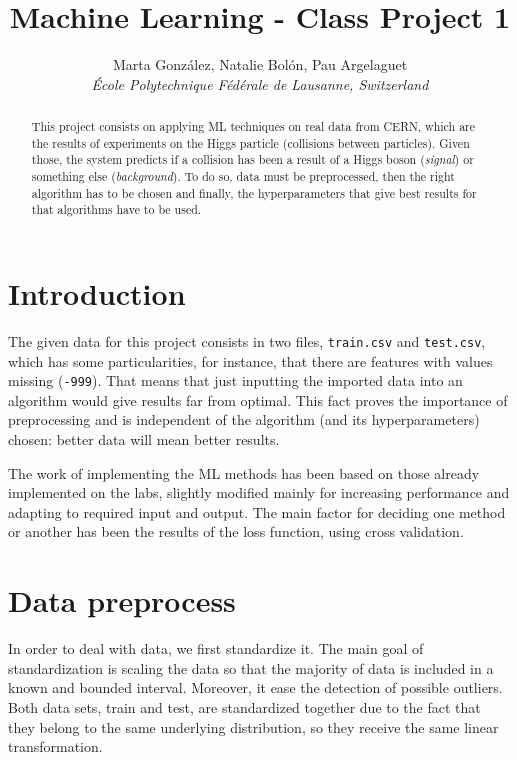 \documentclass[10pt,conference]{IEEEtran}
\begin{document}
\title{\huge Machine Learning - Class Project 1}

\author{
  Marta González, Natalie Bolón, Pau Argelaguet\\
  \small \textit{École Polytechnique Fédérale de Lausanne, Switzerland}
}

\maketitle

\begin{abstract}
This project consists on applying ML techniques on real data from CERN, which are the results of experiments on the Higgs particle (collisions between particles). Given those, the system predicts if a collision has been a result of a Higgs boson (\textit{signal}) or something else (\textit{background}). To do so, data must be preprocessed, then the right algorithm has to be chosen and finally, the hyperparameters that give best results for that algorithms have to be used.
\end{abstract}

\section{Introduction}

The given data for this project consists in two files, \verb|train.csv| and \verb|test.csv|, which has some particularities, for instance, that there are features with values missing (\verb|-999|). That means that just inputting the imported data into an algorithm would give results far from optimal. This fact proves the importance of preprocessing and is independent of the algorithm (and its hyperparameters) chosen: better data will mean better results.

The work of implementing the ML methods has been based on those already implemented on the labs, slightly modified mainly for increasing performance and adapting to required input and output. The main factor for deciding one method or another has been the results of the loss function, using cross validation.

\section{Data preprocess}
In order to deal with data, we first standardize it. The main goal of standardization is scaling the data so that the majority of data is included in a known and bounded interval. Moreover, it ease the detection of possible outliers. Both data sets, train and test, are standardized together due to the fact that they belong to the same underlying distribution, so they receive the same linear transformation. 
\end{document}
